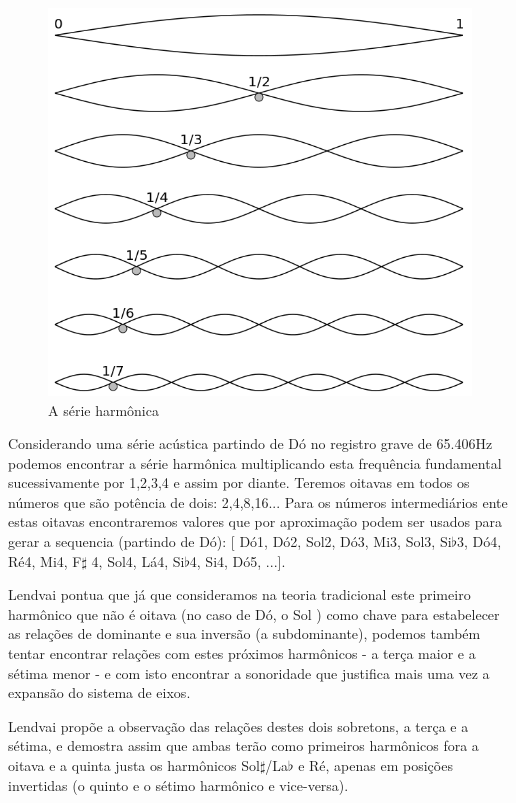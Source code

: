 \documentclass[
	12pt,				%
	openright,			%
	twoside,			%
	a4paper,			%
	english,			%
	french,				%
	spanish,			%
	brazil				%
	]{abntex2}
\begin{document}
\begin{figure}[!h]
	\caption{\label{fig_grafico}A série harmônica }
	\begin{center}
	    \includegraphics[scale=0.3]{axis/serie_harmonica.png}
	\end{center}
\end{figure}

Considerando uma série acústica partindo de Dó no registro grave de 65.406Hz podemos encontrar a série harmônica multiplicando esta frequência fundamental sucessivamente por 1,2,3,4 e assim por diante. Teremos oitavas em todos os números que são potência de dois: 2,4,8,16... Para os números intermediários ente estas oitavas encontraremos valores que por aproximação podem ser usados para gerar a sequencia (partindo de Dó): [ Dó1, Dó2, Sol2, Dó3, Mi3, Sol3, Si$\flat$3, Dó4, Ré4, Mi4, F$\sharp$ 4, Sol4, Lá4, Si$\flat$4, Si4, Dó5, ...].

Lendvai pontua que já que consideramos na teoria tradicional este primeiro harmônico que não é oitava (no caso de Dó, o Sol ) como chave para estabelecer as relações de dominante e sua inversão (a subdominante), podemos também tentar encontrar relações com estes próximos harmônicos - a terça maior e a sétima menor - e com isto encontrar a sonoridade que justifica mais uma vez a expansão do sistema de eixos.

Lendvai propõe a observação das relações destes dois sobretons, a terça e a sétima, e demostra assim que ambas terão como primeiros harmônicos fora a oitava e a quinta justa os harmônicos Sol$\sharp$/La$\flat$  e Ré, apenas em posições invertidas (o quinto e o sétimo harmônico e vice-versa).
\end{document}
